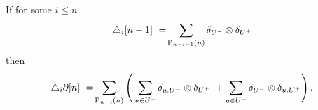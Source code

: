 
\begin{lemma} \label{lemma: boundary of triangle}
	If for some $i \leq n$
	\[
	\triangle_i [n-1]\ =\!
	\sum_{\mathrm{P}_{n-i-1}(n)} \delta_{U^-} \otimes \delta_{U^+}
	\]
	then
	\begin{align}
	\label{equation: triangle of boundary}
	\triangle_i \partial [n] \ =\! \sum_{\mathrm{P}_{n-i}(n)} \left( \,
	\sum_{u \in U^+} \delta_{u.U^-} \otimes \delta_{U^+} \ +
	\sum_{u \in U^-} \delta_{U^-} \otimes \delta_{u.U^+} \right).
	\end{align}
\end{lemma}

